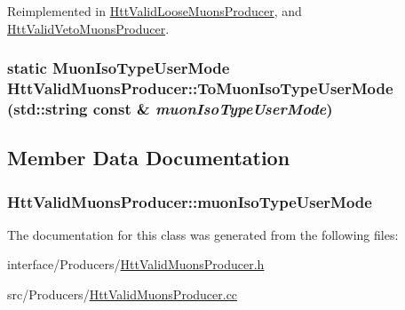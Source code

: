 Reimplemented in \hyperlink{classHttValidLooseMuonsProducer_a5b90c679cc8f4bf597e1435928402e4c}{HttValidLooseMuonsProducer}, and \hyperlink{classHttValidVetoMuonsProducer_a0eee36cccabefc0d4503017243a0409e}{HttValidVetoMuonsProducer}.\hypertarget{classHttValidMuonsProducer_a0ef099aa63658c2b4c17baa8128dad2c}{
\subsubsection[{ToMuonIsoTypeUserMode}]{\setlength{\rightskip}{0pt plus 5cm}static {\bf MuonIsoTypeUserMode} HttValidMuonsProducer::ToMuonIsoTypeUserMode (std::string const \& {\em muonIsoTypeUserMode})}}
\label{classHttValidMuonsProducer_a0ef099aa63658c2b4c17baa8128dad2c}


\subsection{Member Data Documentation}
\hypertarget{classHttValidMuonsProducer_a22ca8a17ba77169e7c70aed8dfb77e75}{
\subsubsection[{muonIsoTypeUserMode}]{ {\bf HttValidMuonsProducer::muonIsoTypeUserMode}}}
\label{classHttValidMuonsProducer_a22ca8a17ba77169e7c70aed8dfb77e75}


The documentation for this class was generated from the following files:\begin{DoxyCompactItemize}
\item 
interface/Producers/\hyperlink{HttValidMuonsProducer_8h}{HttValidMuonsProducer.h}\item 
src/Producers/\hyperlink{HttValidMuonsProducer_8cc}{HttValidMuonsProducer.cc}\end{DoxyCompactItemize}
